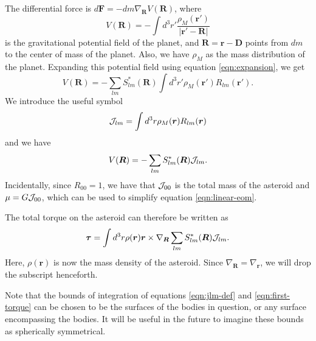 \documentclass[aps,twocolumn,secnumarabic,balancelastpage,amsmath,amssymb,nofootinbib,floatfix]{revtex4-1}
\begin{document}
The differential force is $d\bm F = -dm \nabla_{\bm R} V(\bm R)$, where
$$V(\bm R) = -\int d^3 r' \frac{\rho_M(\bm r')}{|\bm r' - \bm R|}$$
is the gravitational potential field of the planet, and $\bm R = \bm r - \bm D$ points from $dm$ to the center of mass of the planet. Also, we have $\rho_M$ as the mass distribution of the planet. Expanding this potential field using equation \ref{eqn:expansion}, we get
$$V(\bm R) = -\sum_{lm}S^*_{lm}(\bm R)\int d^3 r' \rho_M(\bm r') R_{lm}(\bm r').$$
We introduce the useful symbol
\begin{equation}
\mathcal{J}_{lm} = \int d^3 r \rho_M(\bm r) R_{lm} (\bm r)
\label{eqn:jlm-def}
\end{equation}
and we have
\begin{equation}
V(\bm R) = -\sum_{lm} S^*_{lm} (\bm R) \mathcal{J}_{lm}.
\label{eqn:potential}
\end{equation}
Incidentally, since $R_{00} = 1$, we have that $\mathcal{J}_{00}$ is the total mass of the asteroid and $\mu = G \mathcal{J}_{00}$, which can be used to simplify equation \ref{eqn:linear-eom}.

The total torque on the asteroid can therefore be written as
\begin{equation}
\bm \tau = \int d^3 r \rho(\bm r) \bm r \times \nabla_{\bm R} \sum_{lm} S^*_{lm}(\bm R) \mathcal{J}_{lm}.
\label{eqn:first-torque}
\end{equation}
Here, $\rho(\bm r)$ is now the mass density of the asteroid. Since $\nabla_{\bm R} = \nabla_{\bm r}$, we will drop the subscript henceforth.

Note that the bounds of integration of equations \ref{eqn:jlm-def} and \ref{eqn:first-torque} can be chosen to be the surfaces of the bodies in question, or any surface encompassing the bodies. It will be useful in the future to imagine these bounds as spherically symmetrical.
\end{document}
